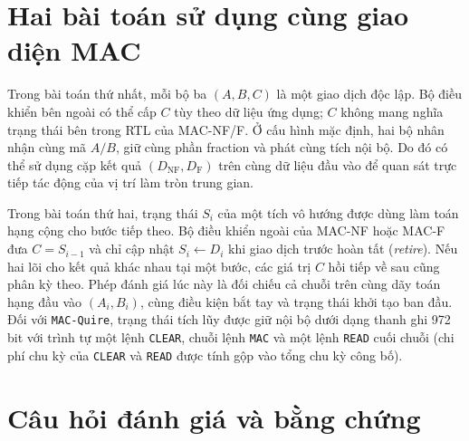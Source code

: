 \section{Hai bài toán sử dụng cùng giao diện MAC}

Trong bài toán thứ nhất, mỗi bộ ba $(A,B,C)$ là một giao dịch độc lập.
Bộ điều khiển bên ngoài có thể cấp $C$ tùy theo dữ liệu ứng dụng; $C$ không
mang nghĩa trạng thái bên trong RTL của MAC-NF/F. Ở cấu hình mặc định, hai bộ
nhân nhận cùng mã $A/B$, giữ cùng phần fraction và phát cùng tích nội bộ. Do
đó có thể sử dụng cặp kết quả $(D_{\mathrm{NF}}, D_{\mathrm{F}})$ trên cùng
dữ liệu đầu vào để quan sát trực tiếp tác động của vị trí làm tròn trung gian.

Trong bài toán thứ hai, trạng thái $S_i$ của một tích vô hướng được dùng làm
toán hạng cộng cho bước tiếp theo. Bộ điều khiển ngoài của MAC-NF hoặc MAC-F
đưa $C = S_{i-1}$ và chỉ cập nhật $S_i \gets D_i$ khi giao dịch trước hoàn
tất (\textit{retire}). Nếu hai lõi cho kết quả khác nhau tại một bước, các giá
trị $C$ hồi tiếp về sau cũng phân kỳ theo. Phép đánh giá lúc này là đối chiếu
cả chuỗi trên cùng dãy toán hạng đầu vào $(A_i, B_i)$, cùng điều kiện bắt tay
và trạng thái khởi tạo ban đầu. Đối với \texttt{MAC-Quire}, trạng thái tích lũy
được giữ nội bộ dưới dạng thanh ghi 972 bit với trình tự một lệnh \texttt{CLEAR},
chuỗi lệnh \texttt{MAC} và một lệnh \texttt{READ} cuối chuỗi (chi phí chu kỳ của
\texttt{CLEAR} và \texttt{READ} được tính gộp vào tổng chu kỳ công bố).


\section{Câu hỏi đánh giá và bằng chứng}

